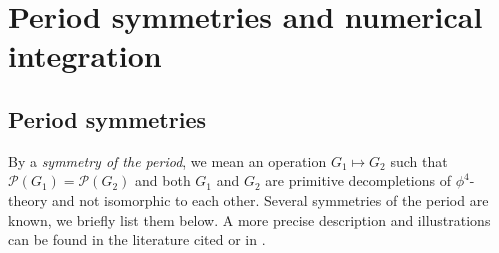 \documentclass[11pt,a4paper]{article}
\newcommand{\period}{\mathcal P}
\renewcommand{\|}{\rule[-0.4ex]{0.2ex}{1.2em}}
\begin{document}
\FloatBarrier


\section{Period symmetries and numerical integration}\label{sec:symmetries}

	




\subsection{Period symmetries}\label{sec:period_symmetries}


By a \emph{symmetry of the period}, we mean an operation $ G_1 \mapsto G_2$ such that $\period(G_1)=\period(G_2)$ and both $G_1$ and $G_2$ are primitive decompletions of $\phi^4$-theory and not isomorphic to each other.
Several symmetries of the period are known, we briefly list them below. A more precise description and illustrations can be found in the literature cited or in \cite{panzer_hepp_2022}.
\end{document}
